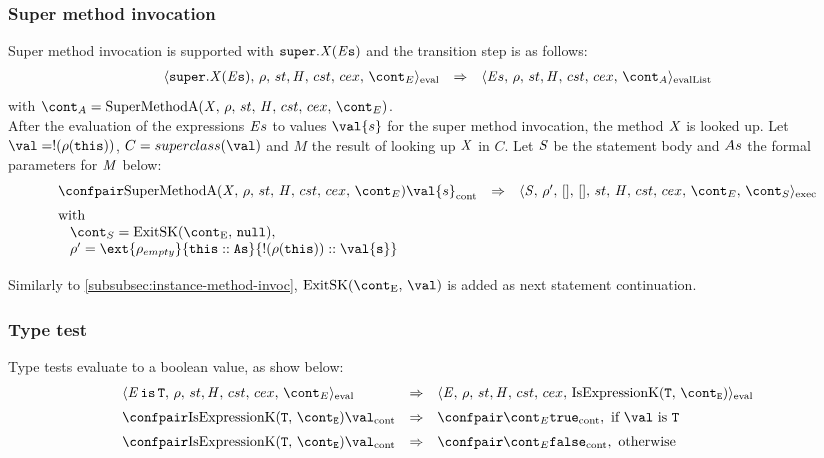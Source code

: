 \documentclass{article}
\begin{document}
\subsubsection{Super method invocation}
\label{subsubsec:super-method-invocation}
\newcommand{\SuperMethodInvocation}[2]{\tt{super}.#1(#2)}
\newcommand{\SuperMethodA}{\mathrm{SuperMethodA}(\idmeta,\,\env,\,\strace,\,\handler,\,\cstrace,\,\cex,\,\econt)}
Super method invocation is supported with $\SuperMethodInvocation{\idmeta}{\expressionsmeta}$ and the transition step is as follows:
\[
  \begin{array}{lcl}
	\cesktrans{
		\evalconf{\SuperMethodInvocation{\idmeta}{\expressionsmeta}}{\env}{\strace}{\cstrace}{\cex}{\econt}}{
		\evallistconf{\expressionsmeta}{\env}{\strace}{\cstrace}{\cex}{\acont}}
  \end{array}
\]
with $\acont = \SuperMethodA$.\\[2mm]
After the evaluation of the expressions $\mathit{E}{s}$ to values $\val{s}$ for the super method invocation, the method $\mathit{X}$ is looked up. Let $\val = \deref{(\env(\this))}$, $C = \superclass{\val}$ and $M$ the result of looking up $\mathit{X}$ in $C$. Let $\mathit{S}$ be the statement body and $As$ the formal parameters for $\mathit{M}$ below:
\[
  \begin{array}{lcl}
	\cesktrans{
		\contconf{\SuperMethodA}{\val{s}}}{
		\execconf{\stmt}{\env'}{[]}{[]}{\handler}{\cstrace}{\cex}{\econt}{\scont}}
	\\[2mm]
	\textrm{with }\\
	\hspace{3mm}\scont = \ExitSK{\tt{null}},\\
	\hspace{3mm}\env' = \ext{\env_{empty}}{\this :: \formals}{\deref{(\env(\this))} :: \val{s}}\\[2mm]
  \end{array}
\]
Similarly to \ref{subsubsec:instance-method-invoc}, $\ExitSK{\val}$ is added as next statement continuation.

\subsubsection{Type test}
\label{subsubsec:type-test}
\newcommand{\IsExpressionK}{\mathrm{IsExpressionK}(\tt{T},\,\econt)}
Type tests evaluate to a boolean value, as show below: 
\[
  \begin{array}{lcl}
	\cesktrans{
		\evalconf{\IsExpression{\expressionmeta}{\tt{T}}}{\env}{\strace}{\cstrace}{\cex}{\econt}}{
		\evalconf{\expressionmeta}{\env}{\strace}{\cstrace}{\cex}{\IsExpressionK}}\\[2mm]

	\cesktrans{
		\contconf{\IsExpressionK}{\val}}{
		\contconf{\econt}{\true}},
		\textrm{ if }\val \textrm{ is } \tt{T}\\[2mm]

	\cesktrans{
		\contconf{\IsExpressionK}{\val}}{
		\contconf{\econt}{\false}}, \textrm{ otherwise}
  \end{array}
\]
\end{document}
